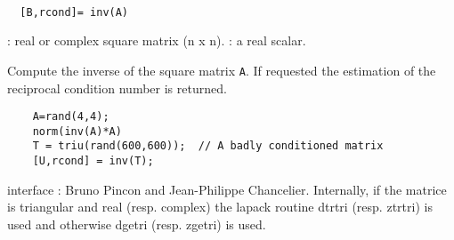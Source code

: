 \begin{mandesc}
   \\ %
\end{mandesc}
\begin{calling_sequence}
\begin{verbatim}
  [B,rcond]= inv(A)  
\end{verbatim}
\end{calling_sequence}
\begin{parameters}
  \begin{varlist}
    : real or complex square matrix (n x n).
    : a real scalar.
  \end{varlist}
\end{parameters}
\begin{mandescription}
  Compute the inverse of the square matrix \verb!A!. If requested 
  the estimation of the reciprocal condition number is returned. 
\end{mandescription}
\begin{examples}
  \begin{Verbatim}
    A=rand(4,4);
    norm(inv(A)*A)
    T = triu(rand(600,600));  // A badly conditioned matrix 
    [U,rcond] = inv(T);
  \end{Verbatim}
\end{examples}
\begin{manseealso}
\end{manseealso}
\begin{authors}
   interface : Bruno Pincon and Jean-Philippe Chancelier. 
   Internally, if the matrice is triangular and real (resp. complex) the lapack routine dtrtri (resp. ztrtri) is used and otherwise dgetri (resp. zgetri) is used.
\end{authors}
